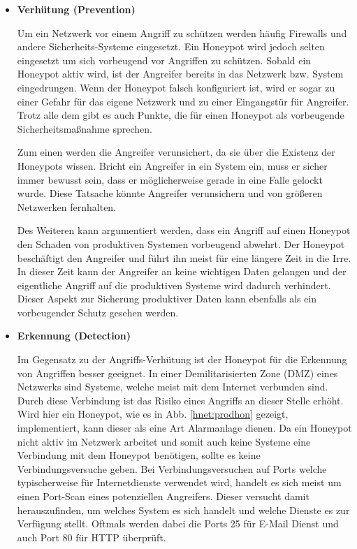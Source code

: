 \begin{itemize}							%
\item{\textbf{Verhütung (Prevention)}} 

Um ein Netzwerk vor einem Angriff zu schützen werden häufig Firewalls und andere Sicherheits-Systeme eingesetzt. Ein Honeypot wird jedoch selten eingesetzt um sich vorbeugend vor Angriffen zu schützen. Sobald ein Honeypot aktiv wird, ist der Angreifer bereits in das Netzwerk bzw. System eingedrungen. Wenn der Honeypot falsch konfiguriert ist, wird er sogar zu einer Gefahr für das eigene Netzwerk und zu einer Eingangstür für Angreifer. Trotz alle dem gibt es auch Punkte, die für einen Honeypot als vorbeugende Sicherheitsmaßnahme sprechen.

Zum einen werden die Angreifer verunsichert, da sie über die Existenz der Honeypots wissen. Bricht ein Angreifer in ein System ein, muss er sicher immer bewusst sein, dass er möglicherweise gerade in eine Falle gelockt wurde. Diese Tatsache könnte Angreifer verunsichern und von größeren Netzwerken fernhalten. 

Des Weiteren kann argumentiert werden, dass ein Angriff auf einen Honeypot den Schaden von produktiven Systemen vorbeugend abwehrt. Der Honeypot beschäftigt den Angreifer und führt ihn meist für eine längere Zeit in die Irre. In dieser Zeit kann der Angreifer an keine wichtigen Daten gelangen und der eigentliche Angriff auf die produktiven Systeme wird dadurch verhindert. Dieser Aspekt zur Sicherung produktiver Daten kann ebenfalls als ein vorbeugender Schutz gesehen werden.   
\item{\textbf{Erkennung (Detection)}}

Im Gegensatz zu der Angriffs-Verhütung ist der Honeypot für die Erkennung von Angriffen besser geeignet. In einer Demilitarisierten Zone (DMZ) eines Netzwerks sind Systeme, welche meist mit dem Internet verbunden sind. Durch diese Verbindung ist das Risiko eines Angriffs an dieser Stelle erhöht. Wird hier ein Honeypot, wie es in Abb. \ref{hnet:prodhon} gezeigt, implementiert, kann dieser als eine Art Alarmanlage dienen. Da ein Honeypot nicht aktiv im Netzwerk arbeitet und somit auch keine Systeme eine Verbindung mit dem Honeypot benötigen, sollte es keine Verbindungsversuche geben.
Bei Verbindungsversuchen auf Ports welche typischerweise für Internetdienste verwendet wird, handelt es sich meist um einen Port-Scan eines potenziellen Angreifers. Dieser versucht damit herauszufinden, um welches System es sich handelt und welche Dienste es zur Verfügung stellt. Oftmals werden dabei die Ports 25 für E-Mail Dienst und auch Port 80 für HTTP überprüft. 


\end{itemize}
